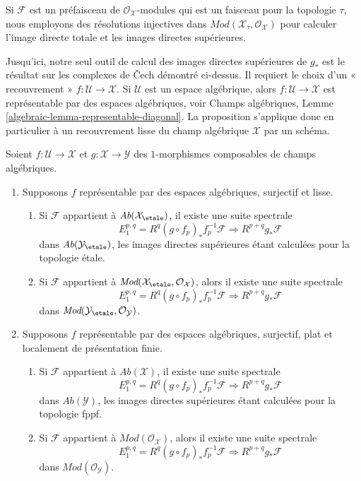 \medskip\noindent
Si $\mathcal{F}$ est un préfaisceau de $\mathcal{O}_\mathcal{X}$-modules
qui est un faisceau pour la topologie $\tau$, nous employons des résolutions
injectives dans $\textit{Mod}(\mathcal{X}_\tau, \mathcal{O}_\mathcal{X})$
pour calculer l'image directe totale et les images directes supérieures.

\medskip\noindent
Jusqu'ici, notre seul outil de calcul des images directes supérieures de $g_*$
est le résultat sur les complexes de {\v C}ech démontré ci-dessus. Il requiert le choix
d'un « recouvrement » $f : \mathcal{U} \to \mathcal{X}$. Si $\mathcal{U}$
est un espace algébrique, alors $f : \mathcal{U} \to \mathcal{X}$
est représentable par des espaces algébriques, voir
Champs algébriques, Lemme \ref{algebraic-lemma-representable-diagonal}.
La proposition s'applique donc en particulier à un recouvrement lisse du
champ algébrique $\mathcal{X}$ par un schéma.

\begin{proposition}
\label{proposition-smooth-covering-compute-direct-image}
Soient $f : \mathcal{U} \to \mathcal{X}$ et $g : \mathcal{X} \to \mathcal{Y}$
des $1$-morphismes composables de champs algébriques.
\begin{enumerate}
\item Supposons $f$ représentable par des espaces algébriques, surjectif et
lisse.
\begin{enumerate}
\item Si $\mathcal{F}$ appartient à $\textit{Ab}(\mathcal{X}_\etale)$,
il existe une suite spectrale
$$
E_1^{p, q} = R^q(g \circ f_p)_*f_p^{-1}\mathcal{F}
\Rightarrow
R^{p + q}g_*\mathcal{F}
$$
dans $\textit{Ab}(\mathcal{Y}_\etale)$, les images directes supérieures étant
calculées pour la topologie \'etale.
\item Si $\mathcal{F}$ appartient à
$\textit{Mod}(\mathcal{X}_\etale, \mathcal{O}_\mathcal{X})$, alors
il existe une suite spectrale
$$
E_1^{p, q} = R^q(g \circ f_p)_*f_p^{-1}\mathcal{F}
\Rightarrow
R^{p + q}g_*\mathcal{F}
$$
dans $\textit{Mod}(\mathcal{Y}_\etale, \mathcal{O}_\mathcal{Y})$.
\end{enumerate}
\item Supposons $f$ représentable par des espaces algébriques, surjectif,
plat et localement de présentation finie.
\begin{enumerate}
\item Si $\mathcal{F}$ appartient à $\textit{Ab}(\mathcal{X})$, il existe
une suite spectrale
$$
E_1^{p, q} = R^q(g \circ f_p)_*f_p^{-1}\mathcal{F}
\Rightarrow
R^{p + q}g_*\mathcal{F}
$$
dans $\textit{Ab}(\mathcal{Y})$, les images directes supérieures étant
calculées pour la topologie fppf.
\item Si $\mathcal{F}$ appartient à $\textit{Mod}(\mathcal{O}_\mathcal{X})$, alors
il existe une suite spectrale
$$
E_1^{p, q} = R^q(g \circ f_p)_*f_p^{-1}\mathcal{F}
\Rightarrow
R^{p + q}g_*\mathcal{F}
$$
dans $\textit{Mod}(\mathcal{O}_\mathcal{Y})$.
\end{enumerate}
\end{enumerate}
\end{proposition}

